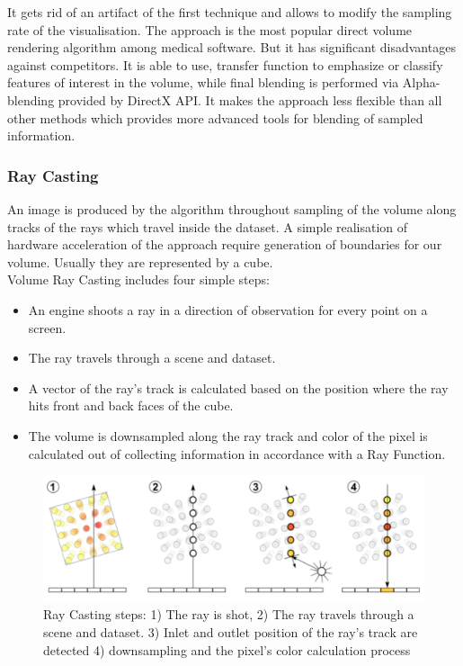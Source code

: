 \documentclass[twoside, english, 11pt]{report}
\begin{document}
It gets rid of an artifact of the first technique and allows to modify the sampling rate of the visualisation. The approach is the most popular direct volume rendering algorithm among medical software. But it has significant disadvantages against competitors. It is able to use, transfer function to emphasize or classify features of interest in the volume, while final blending is performed via Alpha-blending provided by DirectX API. It makes the approach less flexible than all other methods which provides more advanced tools for blending of sampled information.

\subsubsection{Ray Casting}

An image is produced by the algorithm throughout sampling of the volume along tracks of the rays which travel inside the dataset. A simple realisation of hardware acceleration of the approach require generation of boundaries for our volume. Usually they are represented by a cube.\\

Volume Ray Casting includes four simple steps:
\begin{itemize} \item An engine shoots a ray in a direction of observation for every point on a screen.
\item The ray travels through a scene and dataset.
\item A vector of the ray's track is calculated based on the position where the ray hits front and back faces of the cube.
\item The volume is downsampled along the ray track and color of the pixel is calculated out of collecting information in accordance with a Ray Function.
\end{itemize}
\begin{figure}[!h]
\centerline{\includegraphics[scale=0.35]{img/rayCast}}
\caption{Ray Casting steps: 1) The ray is shot, 2) The ray travels through a scene and dataset. 3) Inlet and outlet position of the ray's track are detected 4) downsampling and the pixel's color calculation process}
\end{figure}
\end{document}
